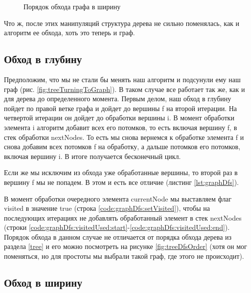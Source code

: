 \documentclass[../../article.tex]{subfiles}
\begin{document}
\begin{figure}
    \caption{Порядок обхода графа в ширину}
    \label{fig:graphBfsOrder}
\end{figure}

Что ж, после этих манипуляций структура дерева не сильно поменялась, как и алгоритм ее обхода, хоть это теперь и граф.

\subsection{Обход в глубину}

Предположим, что мы не стали бы менять наш алгоритм и подсунули ему наш граф (рис. \ref{fig:treeTurningToGraph}). В таком случае все работает так же, как и для дерева до определенного момента. Первым делом, наш обход в глубину пойдет по правой ветке графа и дойдет до вершины {\firacodebold f} на второй итерации. На четвертой итерации он дойдет до обработки вершины {\firacodebold i}. В момент обработки элемента {\firacodebold i} алгоритм добавит всех его потомков, то есть включая вершину {\firacodebold f}, в стек обработки {\firacodebold nextNodes}. То есть мы снова вернемся к обработке элемента {\firacodebold f} и снова добавим всех потомков {\firacodebold f} на обработку, а дальше потомков его потомков, включая вершину {\firacodebold i}. В итоге получается бесконечный цикл.

Если же мы исключим из обхода уже обработанные вершины, то второй раз в вершину {\firacodebold f} мы не попадем. В этом и есть все отличие (листинг \ref{lst:graphDfs}).

В момент обработки очередного элемента {\firacodebold currentNode} мы выставляем флаг {\firacodebold visited} в значение {\firacodebold true} (строка \ref{code:graphDfs:setVisited}), чтобы на последующих итерациях не добавлять обработанный элемент в стек {\firacodebold nextNodes} (строки \ref{code:graphDfs:visitedUsed:start}-\ref{code:graphDfs:visitedUsed:end}). Порядок обхода в данном случае не отличается от порядка обхода дерева из раздела \ref{tree} и его можно посмотреть на рисунке \ref{fig:treeDfsOrder} (хотя он мог поменяться, но для простоты мы выбрали такой граф, где этого не происходит).

\subsection{Обход в ширину}
\end{document}
